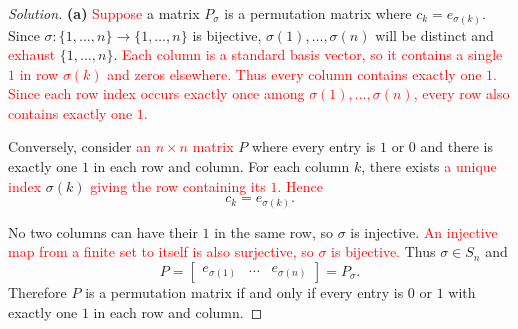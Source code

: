 \begin{proof}[Solution]
\textbf{(a)} \textcolor{red}{Suppose} a matrix
\(P_\sigma\) is a permutation matrix where \(c_k=e_{\sigma(k)}\).
Since \(\sigma:\{1,\ldots,n\}\to\{1,\ldots,n\}\) is bijective,
\(\sigma(1),\ldots,\sigma(n)\) will be distinct and
\textcolor{red}{exhaust} \(\{1,\ldots,n\}\).
\textcolor{red}{Each column is a standard basis vector, so it contains a
single \(1\) in row \(\sigma(k)\) and zeros elsewhere. Thus every column
contains exactly one \(1\). Since each row index occurs exactly once among
\(\sigma(1),\ldots,\sigma(n)\), every row also contains exactly one \(1\).}

Conversely, consider \textcolor{red}{an \(n\times n\) matrix} \(P\)
where every entry is \(1\) or \(0\) and there is exactly one \(1\)
in each row and column. For each column \(k\), there exists
\textcolor{red}{a unique index} \(\sigma(k)\)
\textcolor{red}{giving the row containing its \(1\). Hence}
\[
  c_k=e_{\sigma(k)}.
\]

No two columns can have their \(1\) in the same row, so \(\sigma\) is
injective. \textcolor{red}{An injective map from a finite set to itself
is also surjective, so \(\sigma\) is bijective.} Thus \(\sigma\in S_n\)
and
\[
  P=\begin{bmatrix}e_{\sigma(1)}&\ldots&e_{\sigma(n)}\end{bmatrix}
    =P_\sigma.
\]
Therefore \(P\) is a permutation matrix if and only if every entry is
\(0\) or \(1\) with exactly one \(1\) in each row and column.


\end{proof}
